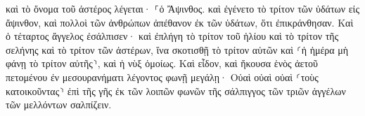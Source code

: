\documentclass{openreader}
\begin{document}
καὶ τὸ ὄνομα τοῦ ἀστέρος λέγεται· ⸀ὁ Ἄψινθος. καὶ ἐγένετο τὸ τρίτον τῶν ὑδάτων εἰς ἄψινθον, καὶ πολλοὶ τῶν ἀνθρώπων ἀπέθανον ἐκ τῶν ὑδάτων, ὅτι ἐπικράνθησαν. 
Καὶ ὁ τέταρτος ἄγγελος ἐσάλπισεν· καὶ ἐπλήγη τὸ τρίτον τοῦ ἡλίου καὶ τὸ τρίτον τῆς σελήνης καὶ τὸ τρίτον τῶν ἀστέρων, ἵνα σκοτισθῇ τὸ τρίτον αὐτῶν καὶ ⸂ἡ ἡμέρα μὴ φάνῃ τὸ τρίτον αὐτῆς⸃, καὶ ἡ νὺξ ὁμοίως. 
Καὶ εἶδον, καὶ ἤκουσα ἑνὸς ἀετοῦ πετομένου ἐν μεσουρανήματι λέγοντος φωνῇ μεγάλῃ· Οὐαὶ οὐαὶ οὐαὶ ⸂τοὺς κατοικοῦντας⸃ ἐπὶ τῆς γῆς ἐκ τῶν λοιπῶν φωνῶν τῆς σάλπιγγος τῶν τριῶν ἀγγέλων τῶν μελλόντων σαλπίζειν. 
\end{document}
